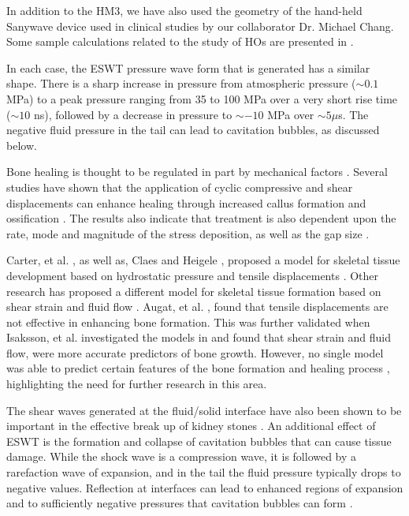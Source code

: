 \documentclass{article}
\begin{document}
In addition to the HM3, we have also used the geometry of the
hand-held Sanywave device used in clinical studies
by our collaborator Dr. Michael Chang.
Some sample calculations related to the study of HOs are presented in
.

In each case, the ESWT pressure wave form
that is generated has a similar shape. There is a sharp increase
in pressure from atmospheric pressure ($\sim0.1$MPa)
to a peak  pressure ranging from 35 to 100
MPa over a very short rise time ($\sim10$ ns), 
followed by a decrease in pressure to $\sim-10$
MPa over $\sim5 \mu$s. The negative fluid pressure in the tail can lead to
cavitation bubbles, as discussed below.
  

Bone healing is thought to be regulated in part by mechanical factors \cite{morgan2008, huang2010, turner1998, robling2002,huang2010,goodship1985,turner1998}.  Several studies have shown that the application of cyclic compressive and shear displacements can enhance healing through increased callus formation and ossification \cite{morgan2008, robling2002, roblingcyclic2002, saxon2005,park1998,weinbaum1994}.  The results also indicate that treatment is also dependent upon the rate, mode and magnitude of the stress deposition\cite{morgan2008}, as well as the gap size \cite{claes1995}. 

Carter, et al. \cite{carter1998}, as well as, Claes and Heigele \cite{claes1999}, proposed a model for skeletal tissue development based on hydrostatic pressure and tensile displacements \cite{claes1999}.  Other research has proposed a different model for skeletal tissue formation based on shear strain and fluid flow \cite{prendergast1997,lacroix2002}.  Augat, et al. \cite{augat2001}, found that tensile displacements are not effective in enhancing bone formation.  This was further validated when Isaksson, et al. \cite{isaksson2006} investigated the models in \cite{claes1999, carter1998, prendergast1997, lacroix2002} and found that shear strain and fluid flow, were more accurate predictors of bone growth. However, no single model was able to predict certain features of the bone formation and healing process \cite{morgan2008}, highlighting the need for further research in this area. 

 
The shear waves generated at the fluid/solid interface have also been shown to be important in 
the effective break up of kidney stones \cite{bailey_oleg,freund}.  An additional effect of ESWT is the
formation and collapse of cavitation bubbles that can cause tissue
damage.  While the shock wave is a compression wave, it is followed
by a rarefaction wave of expansion, and in the tail the fluid
pressure typically drops to negative values.  Reflection at interfaces
can lead to enhanced regions of expansion and to sufficiently
negative pressures that cavitation bubbles can form \cite{matula_direct, tanguay, coleman}.
\end{document}
